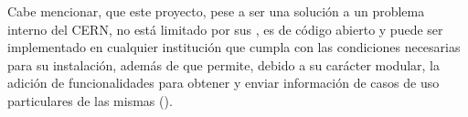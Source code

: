 Cabe mencionar, que este proyecto, pese a ser una solución a un problema interno del CERN, no está limitado por sus , es de código abierto y puede ser implementado en cualquier institución que cumpla con las condiciones necesarias para su instalación, además de que permite, debido a su carácter modular, la adición de funcionalidades para obtener y enviar información de casos de uso particulares de las mismas ().

